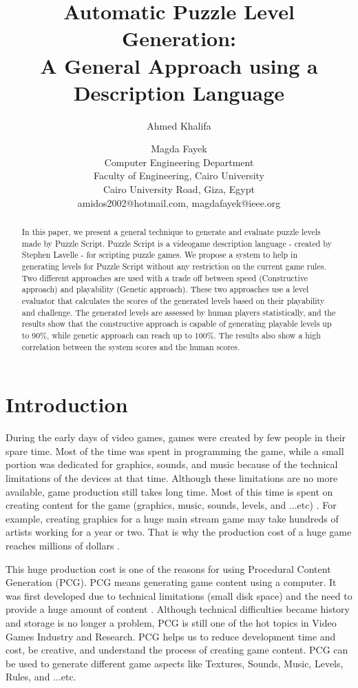 \documentclass[letterpaper]{article}
\title{Automatic Puzzle Level Generation:\\
A General Approach using a Description Language}
\author{Ahmed Khalifa \and Magda Fayek\\
Computer Engineering Department\\
Faculty of Engineering, Cairo University\\
Cairo University Road, Giza, Egypt\\
amidos2002@hotmail.com, magdafayek@ieee.org\\
}
\begin{document}
 
\maketitle
\begin{abstract}
In this paper, we present a general technique to generate and evaluate puzzle levels made by Puzzle Script. Puzzle Script is a videogame description language - created by Stephen Lavelle - for scripting puzzle games. We propose a system to help in generating levels for Puzzle Script without any restriction on the current game rules. Two different approaches are used with a trade off between speed (Constructive approach) and playability (Genetic approach). These two approaches use a level evaluator that calculates the scores of the generated levels based on their playability and challenge. The generated levels are assessed by human players statistically, and the results show that the constructive approach is capable of generating playable levels up to 90\%, while genetic approach can reach up to 100\%. The results also show a high correlation between the system scores and the human scores.
\end{abstract}

\section{Introduction}
During the early days of video games, games were created by few people in their spare time. Most of the time was spent in programming the game, while a small portion was dedicated for graphics, sounds, and music because of the technical limitations of the devices at that time. Although these limitations are no more available, game production still takes long time. Most of this time is spent on creating content for the game (graphics, music, sounds, levels, and ...etc) \citeauthor{budgetAAA}. For example, creating graphics for a huge main stream game may take hundreds of artists working for a year or two. That is why the production cost of a huge game reaches millions of dollars \citeauthor{gameCost}.\\\par

This huge production cost is one of the reasons for using Procedural Content Generation (PCG). PCG means generating game content using a computer. It was first developed due to technical limitations (small disk space) and the need to provide a huge amount of content \citeauthor{pcgFirstGame}. Although technical difficulties became history and storage is no longer a problem, PCG is still one of the hot topics in Video Games Industry and Research. PCG helps us to reduce development time and cost, be creative, and understand the process of creating game content. PCG can be used to generate different game aspects like Textures, Sounds, Music, Levels, Rules, and ...etc.\\\par
\end{document}

